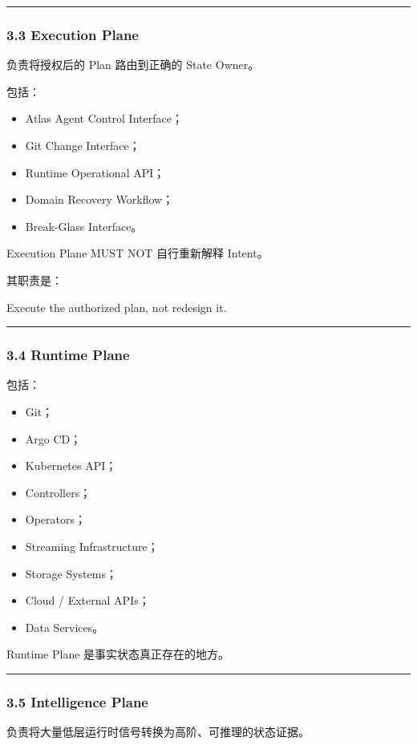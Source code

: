 \documentclass[11pt,a4paper]{article}
\begin{document}
\vspace{0.5em}\hrule\vspace{0.5em}
\subsubsection{3.3 Execution Plane}
负责将授权后的 Plan 路由到正确的 State Owner。

包括：

\begin{itemize}
  \item Atlas Agent Control Interface；
  \item Git Change Interface；
  \item Runtime Operational API；
  \item Domain Recovery Workflow；
  \item Break-Glass Interface。
\end{itemize}
Execution Plane MUST NOT 自行重新解释 Intent。

其职责是：

\begin{gfmBlockquote}
Execute the authorized plan, not redesign it.
\end{gfmBlockquote}
\vspace{0.5em}\hrule\vspace{0.5em}
\subsubsection{3.4 Runtime Plane}
包括：

\begin{itemize}
  \item Git；
  \item Argo CD；
  \item Kubernetes API；
  \item Controllers；
  \item Operators；
  \item Streaming Infrastructure；
  \item Storage Systems；
  \item Cloud / External APIs；
  \item Data Services。
\end{itemize}
Runtime Plane 是事实状态真正存在的地方。

\vspace{0.5em}\hrule\vspace{0.5em}
\subsubsection{3.5 Intelligence Plane}
负责将大量低层运行时信号转换为高阶、可推理的状态证据。
\end{document}

